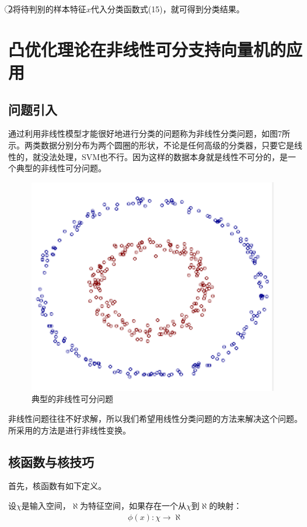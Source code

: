 \documentclass[12pt,a4paper]{article}%
\begin{document}
	\textcircled{2}将待判别的样本特征$x$代入分类函数式(15)，就可得到分类结果。
	
	
	\section{凸优化理论在非线性可分支持向量机的应用}
	\subsection{问题引入}
	通过利用非线性模型才能很好地进行分类的问题称为非线性分类问题，如图7所示。两类数据分别分布为两个圆圈的形状，不论是任何高级的分类器，只要它是线性的，就没法处理，SVM也不行。因为这样的数据本身就是线性不可分的，是一个典型的非线性可分问题。
	\begin{figure}[H]%
		\centering
		\begin{minipage}{0.6\textwidth}%
			\centering
			\includegraphics[width=0.8%
			\textwidth]{figure9}%
			\caption{\fontsize{10pt}{15pt}\selectfont 典型的非线性可分问题}%
		\end{minipage}
	\end{figure}
	非线性问题往往不好求解，所以我们希望用线性分类问题的方法来解决这个问题。所采用的方法是进行非线性变换。
	\subsection{核函数与核技巧}
	首先，核函数有如下定义。
	
	设$\chi$是输入空间，$\aleph$为特征空间，如果存在一个从$\chi$到$\aleph$的映射：
	\begin{align}
		\phi(x):\chi\rightarrow\aleph
	\end{align}
	
\end{document}
